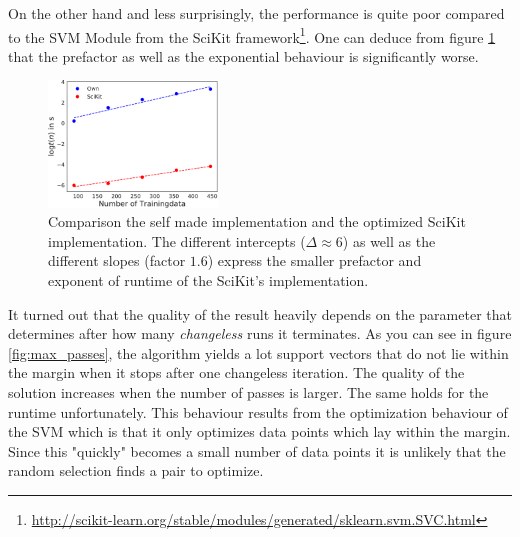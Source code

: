 On the other hand and less surprisingly, the performance is quite poor compared to the SVM Module from the SciKit framework\footnote{\url{http://scikit-learn.org/stable/modules/generated/sklearn.svm.SVC.html}}. One can deduce from figure \ref{fig:benchmark} that the prefactor as well as the exponential behaviour is significantly worse.

\begin{figure}
  \centering
    \includegraphics[width=0.4\textwidth]{media_saved/benchmark}
  \caption{Comparison the self made implementation and the optimized SciKit implementation. The different intercepts ($\Delta \approx 6$) as well as the different slopes (factor $1.6$) express the smaller prefactor and exponent of runtime of the SciKit's implementation.}  
  \label{fig:benchmark}  
\end{figure}

It turned out that the quality of the result heavily depends on the parameter that determines after how many \textit{changeless} runs it terminates. As you can see in figure \ref{fig:max_passes}, the algorithm yields a lot support vectors that do not lie within the margin when it stops after one changeless iteration. The quality of the solution increases when the number of passes is larger. The same holds for the runtime unfortunately. This behaviour results from the optimization behaviour of the SVM which is that it only optimizes data points which lay within the margin. Since this "quickly" becomes a small number of data points it is unlikely that the random selection finds a pair to optimize.

